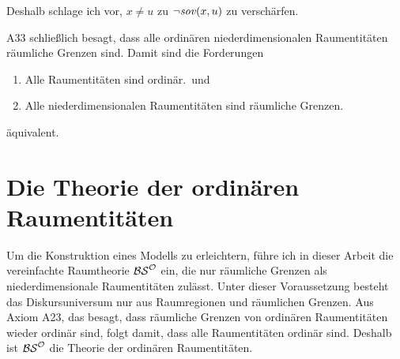     Deshalb schlage ich vor, $x \neq u$ zu $\neg \mathit{sov}(x,u)$ zu verschärfen.
% 
% 				

    A33
    schließlich besagt, dass alle ordinären niederdimensionalen Raumentitäten räumliche Grenzen sind.
    Damit sind die Forderungen
    \begin{enumerate}
     \item \glqq Alle Raumentitäten sind ordinär.\grqq\ und
     \item \glqq Alle niederdimensionalen Raumentitäten sind räumliche Grenzen.\grqq
    \end{enumerate}
    äquivalent.


    
\section{Die Theorie der ordinären Raumentitäten}\label{sec:bso}
Um die Konstruktion eines Modells zu erleichtern, führe ich in dieser Arbeit die vereinfachte Raumtheorie $\mathcal{BS}^{\mathcal{O}}$ ein, die nur räumliche Grenzen als niederdimensionale Raumentitäten zulässt.
Unter dieser Voraussetzung besteht das Diskursuniversum nur aus Raumregionen und räumlichen Grenzen.
Aus Axiom A23, das besagt, dass räumliche Grenzen von ordinären Raumentitäten wieder ordinär sind, folgt damit, dass alle Raumentitäten ordinär sind.
Deshalb ist $\mathcal{BS}^{\mathcal{O}}$ die Theorie der ordinären Raumentitäten.

